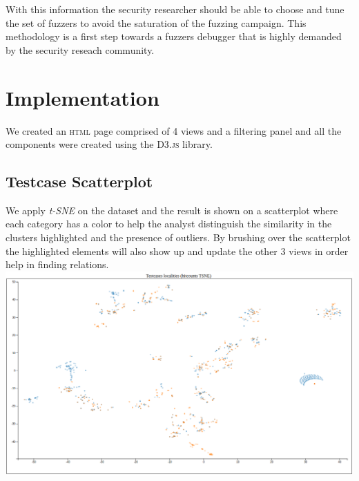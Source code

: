 \documentclass[conference,compsoc]{IEEEtran}
\begin{document}
With this information the security researcher should be able to choose and tune the set of fuzzers to avoid the saturation of the fuzzing campaign. This methodology is a first step towards a fuzzers debugger that is highly demanded by the security reseach community.


\section{Implementation}

We created an \textsc{html} page comprised of 4 views and a filtering panel and all the components were created using the \textsc{D3.js} library.
\subsection{Testcase Scatterplot}

We apply \textit{t-SNE} on the dataset and the result is shown on a scatterplot where each category has a color to help the analyst distinguish the similarity in the clusters highlighted and the presence of outliers.
By brushing over the scatterplot the highlighted elements will also show up and update the other 3 views in order help in finding relations.
\includegraphics[scale=0.2]{img/scatterplot}
\end{document}
